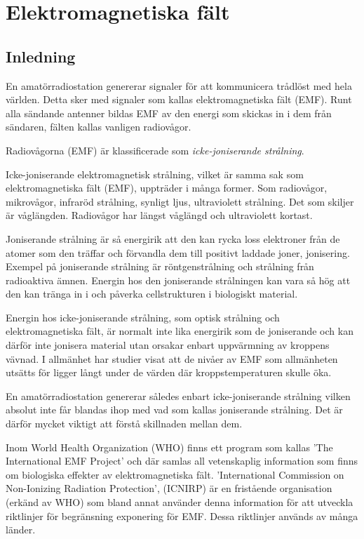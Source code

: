 
\chapter{Elektromagnetiska fält}

\section{Inledning}
En amatörradiostation genererar signaler för att kommunicera trådlöst
med hela världen. Detta sker med signaler som kallas elektromagnetiska
fält (EMF). Runt alla sändande antenner bildas EMF av den energi som
skickas in i dem från sändaren, fälten kallas vanligen radiovågor.

Radiovågorna (EMF) är klassificerade som \emph{icke-joniserande strålning}.

Icke-joniserande elektromagnetisk strålning, vilket är samma sak som
elektromagnetiska fält (EMF), uppträder i många former. Som radiovågor,
mikrovågor, infraröd strålning, synligt ljus, ultraviolett strålning.
Det som skiljer är våglängden. Radiovågor har längst våglängd och
ultraviolett kortast.

Joniserande strålning är så energirik att den kan rycka loss
elektroner från de atomer som den träffar och förvandla dem till
positivt laddade joner, jonisering. Exempel på joniserande
strålning är röntgenstrålning och strålning från radioaktiva ämnen.
Energin hos den joniserande strålningen kan vara så hög att den kan
tränga in i och påverka cellstrukturen i biologiskt material.

Energin hos icke-joniserande strålning, som optisk strålning och
elektromagnetiska fält, är normalt inte lika energirik som de
joniserande och kan därför inte jonisera material utan orsakar enbart
uppvärmning av kroppens vävnad. I allmänhet har studier visat att de
nivåer av EMF som allmänheten utsätts för ligger långt under de värden
där kroppstemperaturen skulle öka.

En amatörradiostation genererar således enbart icke-joniserande
strålning vilken absolut inte får blandas ihop med vad som kallas
joniserande strålning. Det är därför mycket viktigt att förstå
skillnaden mellan dem.

Inom World Health Organization (WHO) finns ett program som kallas
'The International EMF Project' och där samlas all vetenskaplig
information som finns om biologiska effekter av elektromagnetiska fält.
'International Commission on Non-Ionizing Radiation Protection', (ICNIRP)
är en fristående organisation (erkänd av WHO) som bland annat använder denna
information för att utveckla riktlinjer för begränsning exponering för EMF.
Dessa riktlinjer används av många länder.

